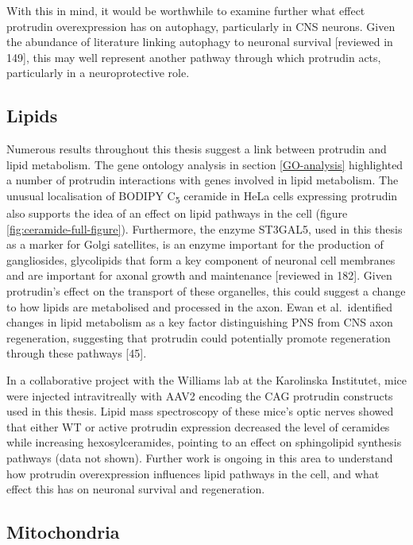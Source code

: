 \documentclass[
  12pt,
  a4paper,
]{book}
\begin{document}
With this in mind, it would be worthwhile to examine further what effect protrudin overexpression has on autophagy, particularly in CNS neurons. Given the abundance of literature linking autophagy to neuronal survival {[}reviewed in 149{]}, this may well represent another pathway through which protrudin acts, particularly in a neuroprotective role.

\hypertarget{discussion-lipids}{%
\subsection{Lipids}\label{discussion-lipids}}

Numerous results throughout this thesis suggest a link between protrudin and lipid metabolism. The gene ontology analysis in section \ref{GO-analysis} highlighted a number of protrudin interactions with genes involved in lipid metabolism. The unusual localisation of BODIPY C\textsubscript{5} ceramide in HeLa cells expressing protrudin also supports the idea of an effect on lipid pathways in the cell (figure \ref{fig:ceramide-full-figure}). Furthermore, the enzyme ST3GAL5, used in this thesis as a marker for Golgi satellites, is an enzyme important for the production of gangliosides, glycolipids that form a key component of neuronal cell membranes and are important for axonal growth and maintenance {[}reviewed in 182{]}. Given protrudin's effect on the transport of these organelles, this could suggest a change to how lipids are metabolised and processed in the axon. Ewan et al.~identified changes in lipid metabolism as a key factor distinguishing PNS from CNS axon regeneration, suggesting that protrudin could potentially promote regeneration through these pathways {[}45{]}.

In a collaborative project with the Williams lab at the Karolinska Institutet, mice were injected intravitreally with AAV2 encoding the CAG protrudin constructs used in this thesis. Lipid mass spectroscopy of these mice's optic nerves showed that either WT or active protrudin expression decreased the level of ceramides while increasing hexosylceramides, pointing to an effect on sphingolipid synthesis pathways (data not shown). Further work is ongoing in this area to understand how protrudin overexpression influences lipid pathways in the cell, and what effect this has on neuronal survival and regeneration.

\hypertarget{mitochondria-1}{%
\subsection{Mitochondria}\label{mitochondria-1}}
\end{document}
